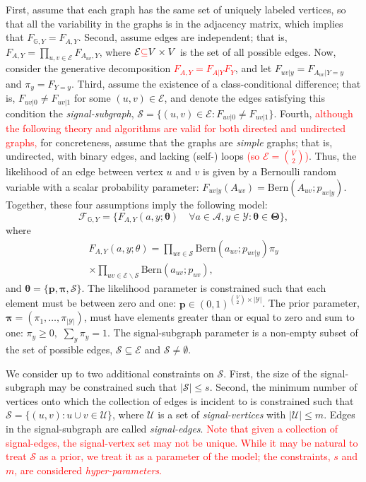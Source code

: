 \documentclass[10pt,journal,cspaper,compsoc]{IEEEtran}
\providecommand{\tr}[1]{\textcolor{red}{#1}}
\providecommand{\ve}[1]{\boldsymbol{#1}}
\newcommand{\GG}{\mathbb{G}}
\newcommand{\bth}{\ve{\theta}}
\newcommand{\bTh}{\ve{\Theta}}
\providecommand{\mc}[1]{\mathcal{#1}}
\providecommand{\mb}[1]{\boldsymbol{#1}}
\begin{document}
First,  assume that each graph has the same set of uniquely labeled vertices, so that all the variability in the graphs is in the adjacency matrix, which implies that $F_{\GG,Y}=F_{A,Y}$. Second, assume edges are independent; that is, $F_{A,Y}=\prod_{u,v \in \mc{E}} F_{A_{uv},Y}$, where 
$\mc{E} \tr{\subseteq} V \times V$ is the set of all possible edges.  Now, consider the generative decomposition \tr{$F_{A,Y}=F_{A|Y} F_Y$}, and let $F_{uv|y}=F_{A_{uv} | Y=y}$ and $\pi_y=F_{Y=y}$.  Third, assume the existence of a class-conditional difference; that is, $F_{uv|0} \neq F_{uv|1}$ for some $(u,v) \in \mc{E}$, and denote the edges satisfying this condition  the \emph{signal-subgraph}, $\mc{S}=\{(u,v) \in \mc{E}: F_{uv|0} \neq F_{uv|1}\}$.  Fourth, \tr{although the following theory and algorithms are valid for both directed and undirected graphs,} for concreteness, assume that the graphs are \emph{simple} graphs; that is, undirected, with binary edges, and lacking (self-) loops \tr{(so $\mc{E}=\binom{V}{2}$)}.  Thus, the likelihood of an edge between vertex $u$ and $v$ is given by a Bernoulli random variable with a scalar probability parameter:  $F_{uv|y}(A_{uv})=\text{Bern}(A_{uv}; p_{uv|y})$. Together, these four assumptions imply the following model: 
\begin{equation}
\mc{F}_{\GG,Y}=\{F_{A, Y}(a,y; \bth) \quad \forall a\in\mc{A},y\in\mc{Y}: \bth \in \bTh\},
\end{equation} 
where
\begin{multline} \label{eq:model}
F_{A,Y}(a,y; \theta) =  \prod_{uv \in \mc{S}} \text{Bern}(a_{uv}; p_{uv|y})  \pi_y 
\\ \times \prod_{uv \in \mc{E} \backslash \mc{S}} \text{Bern}(a_{uv}; p_{uv}),
\end{multline}
and $\bth=\{\mb{p},\mb{\pi},\mc{S}\}$. The likelihood parameter is constrained such that each element must be between zero and one: $\mb{p}\in (0,1)^{\binom{V}{2} \times |\mc{Y}|}$.  The prior parameter, $\mb{\pi}=(\pi_1, \ldots, \pi_{|\mc{Y}|})$, must have elements greater than or equal to zero and sum to one: $\pi_y \geq 0,$ $\sum_y \pi_y=1$.  The signal-subgraph parameter is a non-empty subset of the set of possible edges, $\mc{S} \subseteq \mc{E}$ and $\mc{S} \neq \emptyset$.

We consider up to two additional constraints on $\mc{S}$.  First, the size of the signal-subgraph may be constrained such that $|\mc{S}| \leq s$. Second, the minimum number of vertices onto which the collection of edges is incident to is constrained such that $\mc{S}=\{(u,v): u \cup v \in \mc{U}\}$, where $\mc{U}$ is a set of \emph{signal-vertices} with $|\mc{U}|\leq m$. 
Edges in the signal-subgraph are called \emph{signal-edges}. \tr{Note that given a collection of signal-edges, the signal-vertex set may not be unique.  While it may be natural to treat $\mc{S}$ as a prior, we treat it as a parameter of the model; the constraints, $s$ and $m$, are considered \emph{hyper-parameters}.}
\end{document}
